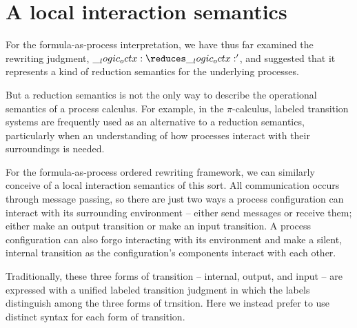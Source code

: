 

\section{A local interaction semantics}%

For the formula-as-process interpretation, we have thus far examined the rewriting judgment, $\octx \reduces \octx'$, and suggested that it represents a kind of reduction semantics for the underlying processes.

But a reduction semantics is not the only way to describe the operational semantics of a process calculus.
For example, in the $\pi$-calculus, labeled transition systems are frequently used as an alternative to a reduction semantics, particularly when an understanding of how processes interact with their surroundings is needed.

For the formula-as-process ordered rewriting framework, we can similarly conceive of a local interaction semantics of this sort.
All communication occurs through message passing, so there are just two ways a process configuration can interact with its surrounding environment -- either send messages or receive them; either make an output transition or make an input transition.
A process configuration can also forgo interacting with its environment and make a silent, internal transition as the configuration's components interact with each other.

Traditionally, these three forms of transition -- internal, output, and input -- are expressed with a unified labeled transition judgment in which the labels distinguish among the three forms of trnsition.
Here we instead prefer to use distinct syntax for each form of transition.

